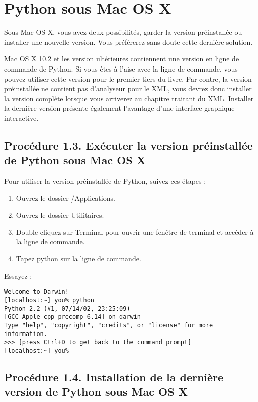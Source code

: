 \section{Python sous Mac OS X}\label{Python sous Mac OS X}

Sous Mac OS X, vous avez deux possibilités, garder la version préinstallée ou installer une nouvelle version. Vous préfèrerez sans doute cette dernière solution.

\medskip
Mac OS X 10.2 et les version ultérieures contiennent une version en ligne de commande de Python. Si vous êtes à l'aise avec la ligne de commande, vous pouvez utiliser cette version pour le premier tiers du livre. Par contre, la version préinstallée ne contient pas d'analyseur pour le XML, vous devrez donc installer la version complète lorsque vous arriverez au chapitre traitant du XML. Installer la dernière version présente également l'avantage d'une interface graphique interactive.

\subsection*{Procédure 1.3. Exécuter la version préinstallée de Python sous Mac OS X}

Pour utiliser la version préinstallée de Python, suivez ces étapes :

\begin {enumerate}
    \item Ouvrez le dossier /Applications.
    \item Ouvrez le dossier Utilitaires.
    \item Double-cliquez sur Terminal pour ouvrir une fenêtre de terminal et accéder à la ligne de commande.
    \item Tapez python sur la ligne de commande.
\end{enumerate}

\medskip
\noindent Essayez :

\begin{lstlisting}
Welcome to Darwin!
[localhost:~] you% python
Python 2.2 (#1, 07/14/02, 23:25:09)
[GCC Apple cpp-precomp 6.14] on darwin
Type "help", "copyright", "credits", or "license" for more information.
>>> [press Ctrl+D to get back to the command prompt]
[localhost:~] you%
\end{lstlisting}

\subsection*{Procédure 1.4. Installation de la dernière version de Python sous Mac OS X}

